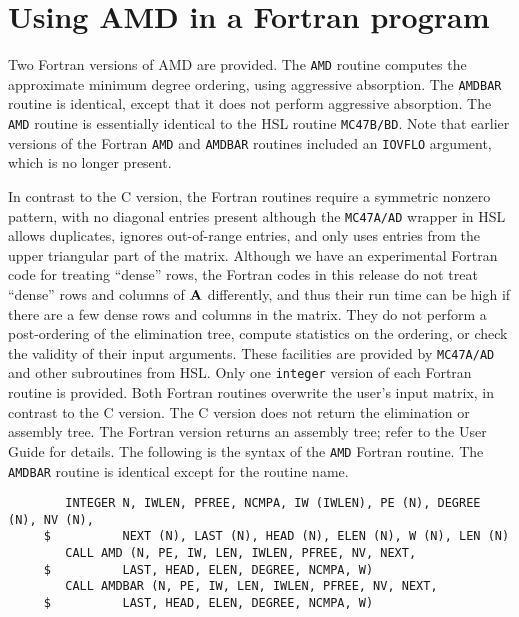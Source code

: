 \documentclass[11pt]{article}
\newcommand{\m}[1]{{\bf{#1}}}       %
\begin{document}
\section{Using AMD in a Fortran program}

Two Fortran versions of AMD are provided.  The {\tt AMD} routine computes the
approximate minimum degree ordering, using aggressive absorption.  The
{\tt AMDBAR} routine is identical, except that it does not perform aggressive
absorption.  The {\tt AMD} routine is essentially identical to the HSL
routine {\tt MC47B/BD}.
Note that earlier versions of the Fortran
{\tt AMD} and {\tt AMDBAR} routines included an {\tt IOVFLO} argument,
which is no longer present.

In contrast to the C version, the Fortran routines require a symmetric
nonzero pattern, with no diagonal entries present although the {\tt MC47A/AD}
wrapper in HSL allows duplicates, ignores out-of-range entries, and only
uses entries from the upper triangular part of the matrix.  Although we
have an experimental Fortran code for treating ``dense'' rows, the Fortran
codes in this release do not treat
``dense'' rows and columns of $\m{A}$ differently, and thus their run time
can be high if there are a few dense rows and columns in the matrix.
They do not perform a post-ordering of the elimination tree,
compute statistics on the ordering, or check the validity of their input
arguments. These facilities are provided by {\tt MC47A/AD} and other
subroutines from HSL.
Only one {\tt integer}
version of each Fortran routine is provided.  
Both Fortran routines overwrite the user's input
matrix, in contrast to the C version.  
%
The C version does not return the elimination or assembly tree.
The Fortran version returns an assembly tree;
refer to the User Guide for details.
The following is the syntax of the {\tt AMD} Fortran routine.
The {\tt AMDBAR} routine is identical except for the routine name.

{\footnotesize
\begin{verbatim}
        INTEGER N, IWLEN, PFREE, NCMPA, IW (IWLEN), PE (N), DEGREE (N), NV (N),
     $          NEXT (N), LAST (N), HEAD (N), ELEN (N), W (N), LEN (N)
        CALL AMD (N, PE, IW, LEN, IWLEN, PFREE, NV, NEXT,
     $          LAST, HEAD, ELEN, DEGREE, NCMPA, W)
        CALL AMDBAR (N, PE, IW, LEN, IWLEN, PFREE, NV, NEXT,
     $          LAST, HEAD, ELEN, DEGREE, NCMPA, W)
\end{verbatim}
}
\end{document}
